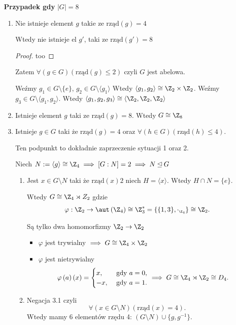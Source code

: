 \textbf{Przypadek gdy} $\left| G \right| = 8$
\begin{enumerate}[label=\arabic*.]
	\item Nie istnieje element $g$ takie ze $\text{rząd}\left( g \right) =4$ 
		\begin{fact}
		Wtedy nie istnieje el $g'$, taki ze $\text{rząd}\left( g' \right) = 8$
		\end{fact}
		\begin{proof}
			too
		\end{proof} 

		Zatem $\forall\left(g\in G\right)\left( \text{rząd}\left( g \right) \le 2 \right)  $ czyli $G$ jest abelowa.

		Weźmy $g_1\in G\setminus \{e\} $, $g_2\in G\setminus \langle g_1 \rangle $ 
		Wtedy $\langle g_1,g_2 \rangle \cong \Z_2\times \Z_2$.
		Weźmy $g_3\in G\setminus \langle g_1,g_2 \rangle $. Wtedy $\langle g_1,g_2,g_3 \rangle \cong \langle \Z_2,\Z_2,\Z_2 \rangle $
	\item Istnieje element $g$ taki ze $\text{rząd}\left(  g\right) = 8$. Wtedy $G\cong\Z_8$
	\item Istnieje $g\in G$ taki że $\text{rząd}\left( g \right) = 4$ oraz $\forall\left(h\in G\right) \left( \text{rząd}\left( h \right) \le 4 \right). $ 

		Ten podpunkt to dokładnie zaprzeczenie sytuacji 1 oraz 2. 

		Niech $N:= \langle g \rangle \cong\Z_4 \implies [G:N] = 2 \implies N\unlhd G$
		\begin{enumerate}[label=\theenumi\arabic*., ref=\theenumi.\arabic*]
			\item Jest $x\in G\setminus N$ taki że $\text{rząd}\left( x \right) 2$
				niech $H = \langle x \rangle $. Wtedy $H\cap N = \{e\} $.

				Wtedy $G\cong\Z_4 \rtimes Z_2$ gdzie 
				\[
				\varphi : \Z_2 \to \aut\left(\Z_4\right) \cong \Z_3^{*}= \{ \{1,3\} , \cdot _{\scriptscriptstyle \Z_4}\} \cong\Z_2
				.\] 

				Są tylko dwa homomorfizmy $\Z_2\to \Z_2$
				\begin{itemize}
					\item $ \varphi$ jest trywialny $\implies G \cong \Z_4 \times \Z_2$
					\item $\varphi$ jest nietrywialny
						\[
						\varphi\left( a \right) \left( x \right) = \begin{cases}
							x, &\text{ gdy } a = 0, \\
							-x, & \text{ gdy } a = 1.
						\end{cases} \implies G\cong \Z_4 \rtimes \Z_2 \cong D_{4}
						.\] 
				\end{itemize}
			\item Negacja 3.1 czyli
				\[
				\forall\left(x\in G\setminus N\right)\left( \text{rząd}\left( x \right) = 4 \right)  
				.\] 
				Wtedy mamy 6 elementów rzędu 4: $\left( G\setminus N \right) \cup \{g,g^{-1}\} $.
				

\end{enumerate}
\end{enumerate}
